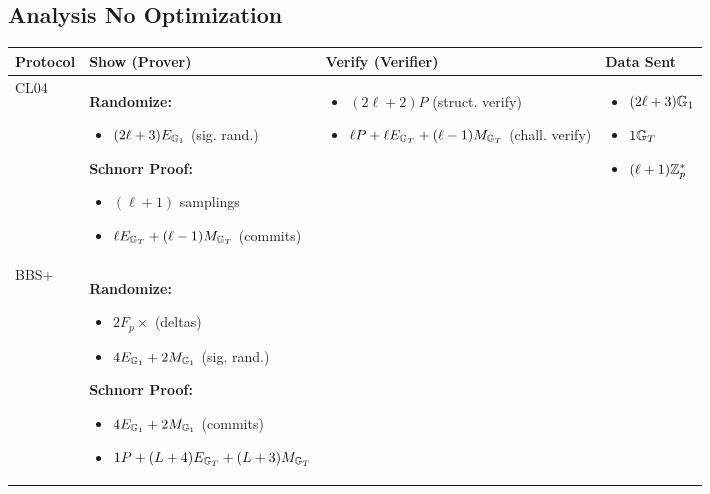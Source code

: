% 
% 



\newpage
\subsection{Analysis No Optimization}
\begin{tabular}{|l|p{4.5cm}|p{4.5cm}|p{3.5cm}|}
    \hline
    \textbf{Protocol} & \textbf{Show (Prover)} & \textbf{Verify (Verifier)} & \textbf{Data Sent} \\
    \hline
    CL04 &
    \textbf{Randomize:}
    \begin{itemize}[nosep]
        \item $(2\ell + 3)E_{\mathbb{G}_1}$ (sig. rand.)
    \end{itemize}
    \textbf{Schnorr Proof:}
    \begin{itemize}[nosep]
        \item $(\ell+1)$ samplings
        \item $\ell E_{\mathbb{G}_T} + (\ell-1)M_{\mathbb{G}_T}$ (commits)
    \end{itemize}
    &
    \begin{itemize}[nosep]
        \item $(2\ell + 2)P$ (struct. verify)
        \item $\ell P + \ell E_{\mathbb{G}_T} + (\ell-1)M_{\mathbb{G}_T}$ (chall. verify)
    \end{itemize}
    &
    \begin{itemize}[nosep]
        \item $(2\ell + 3)\mathbb{G}_1$
        \item $1\mathbb{G}_T$
        \item $(\ell + 1)\mathbb{Z}_p^*$
    \end{itemize}
    \\
    \hline
    BBS+ &
    \textbf{Randomize:}
    \begin{itemize}[nosep]
        \item $2F_p\times$ (deltas)
        \item $4E_{\mathbb{G}_1} + 2M_{\mathbb{G}_1}$ (sig. rand.)
    \end{itemize}
    \textbf{Schnorr Proof:}
    \begin{itemize}[nosep]
        \item $4E_{\mathbb{G}_1} + 2M_{\mathbb{G}_1}$ (commits)
        \item $1P + (L+4)E_{\mathbb{G}_T} + (L+3)M_{\mathbb{G}_T}$
    \end{itemize}
    &
    \begin{itemize}[nosep]

\end{itemize}
\end{tabular}
